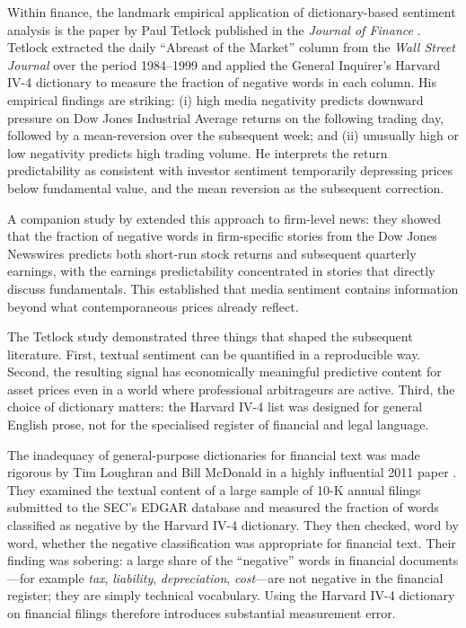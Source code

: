 \begin{context}
Within finance, the landmark empirical application of dictionary-based sentiment analysis
is the paper by Paul Tetlock published in the \emph{Journal of Finance}
\cite{tetlock2007giving}. %
Tetlock extracted the daily ``Abreast of the Market'' column from the \emph{Wall Street
Journal} over the period 1984--1999 and applied the General Inquirer's Harvard IV-4
dictionary to measure the fraction of negative words in each column.  His empirical
findings are striking: (i) high media negativity predicts downward pressure on Dow Jones
Industrial Average returns on the following trading day, followed by a mean-reversion
over the subsequent week; and (ii) unusually high or low negativity predicts high
trading volume.  He interprets the return predictability as consistent with investor
sentiment temporarily depressing prices below fundamental value, and the mean reversion
as the subsequent correction.

A companion study by \citet{tetlock2008words}
extended this approach to firm-level news: they showed that the fraction of negative
words in firm-specific stories from the Dow Jones Newswires predicts both short-run
stock returns and subsequent quarterly earnings, with the earnings predictability
concentrated in stories that directly discuss fundamentals.  This established that
media sentiment contains information beyond what contemporaneous prices already reflect.

The Tetlock study demonstrated three things that shaped the subsequent literature.
First, textual sentiment can be quantified in a reproducible way.  Second, the resulting
signal has economically meaningful predictive content for asset prices even in a world
where professional arbitrageurs are active.  Third, the choice of dictionary matters:
the Harvard IV-4 list was designed for general English prose, not for the specialised
register of financial and legal language.

The inadequacy of general-purpose dictionaries for financial text was made rigorous by
Tim Loughran and Bill McDonald in a highly influential 2011 paper
\cite{loughran2011liability}. %
They examined the textual content of a large sample of 10-K annual filings submitted to
the SEC's EDGAR database and measured the fraction of words classified as negative by
the Harvard IV-4 dictionary.  They then checked, word by word, whether the negative
classification was appropriate for financial text.  Their finding was sobering: a large
share of the ``negative'' words in financial documents---for example \emph{tax},
\emph{liability}, \emph{depreciation}, \emph{cost}---are not negative in the financial
register; they are simply technical vocabulary.  Using the Harvard IV-4 dictionary on
financial filings therefore introduces substantial measurement error.


\end{context}
